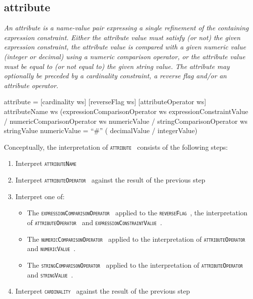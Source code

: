 \documentclass{article}
\def\spec#1{{\tt \small \textsc{{#1}} }}
\def\bnf#1{{\scriptsize {{#1}} }}
\def\desc#1{{\small \textsl{{#1}} }}
\begin{document}
\subsection{attribute}
\begin{framed}
\desc{An attribute is a name-value pair expressing a single refinement of the containing expression constraint. Either the attribute value must satisfy (or not) the given expression constraint, the attribute value is compared with a given numeric value (integer or decimal) using a numeric comparison operator, or the attribute value must be equal to (or not equal to) the given string value. The attribute may optionally be preceded by a cardinality constraint, a reverse flag and/or an attribute operator.}
\end{framed}

\begin{framed}
\noindent
\bnf{attribute = [cardinality ws] [reverseFlag ws] [attributeOperator ws] attributeName ws 		
			(expressionComparisonOperator ws expressionConstraintValue /
			 numericComparisonOperator ws numericValue / 		
			 stringComparisonOperator ws stringValue}
\bnf{numericValue =  ``\#'' ( decimalValue / integerValue)}
\end{framed}

Conceptually, the interpretation of \spec{attribute} consists of the following steps:
\begin{enumerate}[noitemsep]
\item Interpret \spec{attributeName}
\item Interpret \spec{attributeOperator} against the result of the previous step
\item Interpret one of:
\begin{itemize}[noitemsep]
\item The \spec{expressionComparisonOperator} applied to the \spec{reverseFlag}, the interpretation of \spec{attributeOperator} and  \spec{expressionConstraintValue}.
\item The \spec{numericComparisonOperator} applied to the interpretation of \spec{attributeOperator} and  \spec{numericValue}.
\item The \spec{stringComparisonOperator} applied to the interpretation of \spec{attributeOperator} and \spec{stringValue}.
\end{itemize} 
\item Interpret \spec{cardinality} against the result of the previous step
\end{enumerate}
\end{document}
